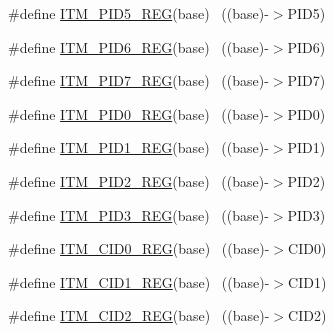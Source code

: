 \begin{DoxyCompactItemize}
\item 
\#define \hyperlink{group___i_t_m___register___accessor___macros_ga4740a0d11d383ca9f9406176f83f736e}{I\+T\+M\+\_\+\+P\+I\+D5\+\_\+\+R\+EG}(base)                                          ~((base)-\/$>$P\+I\+D5)
\item 
\#define \hyperlink{group___i_t_m___register___accessor___macros_gabc5f851ab862e91124ef9a5d54ed0c23}{I\+T\+M\+\_\+\+P\+I\+D6\+\_\+\+R\+EG}(base)                                          ~((base)-\/$>$P\+I\+D6)
\item 
\#define \hyperlink{group___i_t_m___register___accessor___macros_ga4d55d1ec8c7452f081f103a4e4ded062}{I\+T\+M\+\_\+\+P\+I\+D7\+\_\+\+R\+EG}(base)                                          ~((base)-\/$>$P\+I\+D7)
\item 
\#define \hyperlink{group___i_t_m___register___accessor___macros_ga77332c9b64d98cdd7229a6e1953f6a33}{I\+T\+M\+\_\+\+P\+I\+D0\+\_\+\+R\+EG}(base)                                          ~((base)-\/$>$P\+I\+D0)
\item 
\#define \hyperlink{group___i_t_m___register___accessor___macros_gabd8e07732053603e273fa17f9d125ebe}{I\+T\+M\+\_\+\+P\+I\+D1\+\_\+\+R\+EG}(base)                                          ~((base)-\/$>$P\+I\+D1)
\item 
\#define \hyperlink{group___i_t_m___register___accessor___macros_gaf1651b0bd0b4631207e3437f8cfaddaa}{I\+T\+M\+\_\+\+P\+I\+D2\+\_\+\+R\+EG}(base)                                          ~((base)-\/$>$P\+I\+D2)
\item 
\#define \hyperlink{group___i_t_m___register___accessor___macros_ga4f8b157b66d8df5fcaf166f56cf1fee1}{I\+T\+M\+\_\+\+P\+I\+D3\+\_\+\+R\+EG}(base)                                          ~((base)-\/$>$P\+I\+D3)
\item 
\#define \hyperlink{group___i_t_m___register___accessor___macros_ga0c80f56059755478a7d1bc62ef67a9e3}{I\+T\+M\+\_\+\+C\+I\+D0\+\_\+\+R\+EG}(base)                                          ~((base)-\/$>$C\+I\+D0)
\item 
\#define \hyperlink{group___i_t_m___register___accessor___macros_ga68959e3c73327037ca6c037197dc655e}{I\+T\+M\+\_\+\+C\+I\+D1\+\_\+\+R\+EG}(base)                                          ~((base)-\/$>$C\+I\+D1)
\item 
\#define \hyperlink{group___i_t_m___register___accessor___macros_ga5ea3ee7db440781e970bf3eb97d55673}{I\+T\+M\+\_\+\+C\+I\+D2\+\_\+\+R\+EG}(base)                                          ~((base)-\/$>$C\+I\+D2)
\item 

\end{DoxyCompactItemize}
